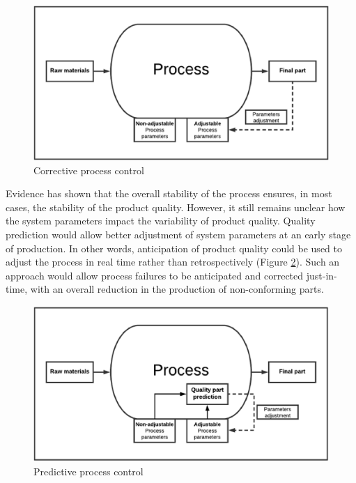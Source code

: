 \begin{figure}
\centerline{\includegraphics[scale=0.7]{images/chapter_3/corrective_approach.eps}}
\caption{Corrective process control}
\label{fig:Corrective process control}
\end{figure}

Evidence has shown that the overall stability of the process ensures, in most cases, the stability of the product quality. However, it still remains unclear how the system parameters impact the variability of product quality. Quality prediction would allow better adjustment of system parameters at an early stage of production. In other words, anticipation of product quality could be used to adjust the process in real time rather than retrospectively (Figure \ref{fig:Predictive process control}). Such an approach would allow process failures to be anticipated and corrected just-in-time, with an overall reduction in the production of non-conforming parts.

\begin{figure}
\centerline{\includegraphics[scale=0.7]{images/chapter_3/predictive_approach.eps}}
\caption{Predictive process control}
\label{fig:Predictive process control}
\end{figure}

